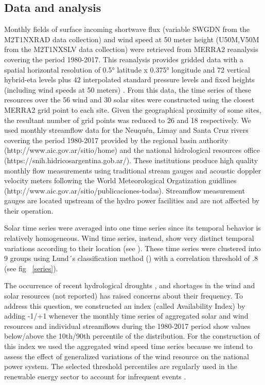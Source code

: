 \documentclass[AMA,Times1COL]{WileyNJDv5} %
\begin{document}
\begin{linenumbers}
\subsection{Data and analysis}

Monthly fields of surface incoming shortwave flux (variable SWGDN from the M2T1NXRAD data collection) and wind speed at 50 meter height (U50M,V50M from the M2T1NXSLV data collection) were retrieved from MERRA2 reanalysis \cite{gelaro2017modern} covering the period 1980-2017. This reanalysis provides gridded data with a spatial horizontal resolution of 0.5° latitude x 0.375° longitude and 72 vertical hybrid-eta levels plus 42 interpolated standard pressure levels and fixed heights (including wind speeds at 50 meters) \cite{bosilovich2015merra, gelaro2017modern}. From this data, the time series of these resources over the 56 wind and 30 solar sites were constructed using the closest MERRA2 grid point to each site. Given the geographical proximity of some sites, the resultant number of grid points was reduced to 26 and 18 respectively. We used monthly streamflow data for the Neuquén, Limay and Santa Cruz rivers covering the period 1980-2017 provided by the regional basin authority (http://www.aic.gov.ar/sitio/home) and the national hidrological resources office (https://snih.hidricosargentina.gob.ar/). These institutions produce high quality monthly flow measurements using traditional stream gauges and acoustic doppler velocity meters following the World Meteorological Orgatization guidlines (http://www.aic.gov.ar/sitio/publicaciones-todas). Streamflow measurement gauges are located upstream of the hydro power facilities and are not affected by their operation.

Solar time series were averaged into one time series since its temporal behavior is relatively homogeneous. Wind time series, instead, show very distinct temporal variations according to their location (see \cite{bianchi2019spatiotemporal}). These time series were clustered into 9 groups using Lund´s classification method (\cite{lund1963map}) with a correlation threshold of .8 (see fig ~\ref{series}).

The occurrence of recent hydrological droughts \cite{aguayo2021hydrological}, and shortages in the wind and solar resources (not reported) has raised concerns about their frequency. To address this question, we constructed an index (called Availability Index) by adding -1/+1 whenever the monthly time series of aggregated solar and wind resources and individual streamflows during the 1980-2017 period show values below/above the 10th/90th percentile of the distribution. For the construction of this index we used the aggregated wind speed time series because we intend to assess the effect of generalized variations of the wind resource on  the national power system. The selected threshold percentiles are regularly used in the renewable energy sector to account for infrequent events \cite{dobos2012p50, pryor2018interannual, aytac2024environmental}.


\end{linenumbers}
\end{document}
